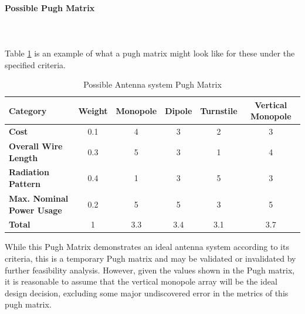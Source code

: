 \paragraph{Possible Pugh Matrix} ~\\ ~\\
Table \ref{tbl:antenna_pugh} is an example of what a pugh matrix might look like for these under the specified criteria.

\begin{table}[H]
\centering
\begin{tabular}{|l|c|c|c|c|c|} 
\hline
    \textbf{Category} & \textbf{Weight} & \textbf{Monopole} & \textbf{Dipole}& \textbf{Turnstile} & \textbf{Vertical Monopole}
    \\
\hline
    \textbf{Cost} & 0.1 & 4 & 3 & 2 & 3
    \\
\hline
    \textbf{Overall Wire Length}& 0.3 & 5 & 3 & 1 & 4
    \\
\hline
    \textbf{Radiation Pattern} & 0.4 & 1 & 3 & 5 & 3
    \\
\hline
    \textbf{Max. Nominal Power Usage}& 0.2 & 5 & 5 & 3 & 5 
    \\
\hline
    \textbf{Total} & 1 & 3.3 & 3.4 & 3.1 & 3.7
    \\
\hline
\end{tabular}
\caption{Possible Antenna system Pugh Matrix }
\label{tbl:antenna_pugh}
\end{table}

While this Pugh Matrix demonstrates an ideal antenna system according to its criteria, this is a temporary Pugh matrix and may be validated or invalidated by further feasibility analysis. However, given the values shown in the Pugh matrix, it is reasonable to assume that the vertical monopole array will be the ideal design decision, excluding some major undiscovered error in the metrics of this pugh matrix.